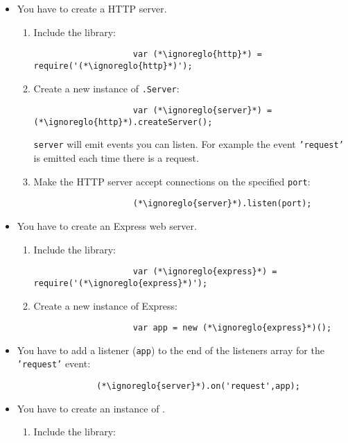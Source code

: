 		\begin{itemize}
			\item You have to create a HTTP server.
			\begin{enumerate}
				\item Include the library:
				\begin{lstlisting}
					var (*\ignoreglo{http}*) = require('(*\ignoreglo{http}*)');
				\end{lstlisting}
				\item Create a new instance of \texttt{.Server}:
				\begin{lstlisting}
					var (*\ignoreglo{server}*) = (*\ignoreglo{http}*).createServer();
				\end{lstlisting}
				\texttt{server} will emit events you can listen. For example the event \texttt{'request'} is emitted each time there is a request.
				\item Make the HTTP server accept connections on the specified \texttt{port}:
				\begin{lstlisting}
					(*\ignoreglo{server}*).listen(port);
				\end{lstlisting}
			\end{enumerate}
			\item You have to create an Express web server.
			\begin{enumerate}
				\item Include the library:
				\begin{lstlisting}
					var (*\ignoreglo{express}*) = require('(*\ignoreglo{express}*)');
				\end{lstlisting}
				\item Create a new instance of Express:
				\begin{lstlisting}
					var app = new (*\ignoreglo{express}*)();
				\end{lstlisting}
			\end{enumerate}
			\item You have to add a listener (\texttt{app}) to the end of the listeners array for the \texttt{'request'} event:
			\begin{lstlisting}
				(*\ignoreglo{server}*).on('request',app);
			\end{lstlisting}
			\item You have to create an instance of .
			\begin{enumerate}
				\item Include the library:
				\begin{lstlisting}

\end{lstlisting}
\end{enumerate}
\end{itemize}
